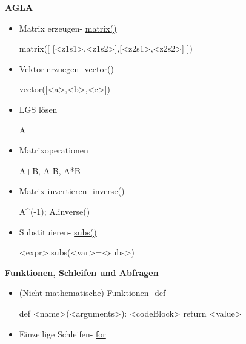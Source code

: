 \documentclass[a4paper,9pt,DIV15,twocolumn]{scrartcl}
\begin{document}
\textbf{AGLA}
\begin{itemize}
\item Matrix erzeugen- \href{https://sage.math.uni-goettingen.de/doc/static/reference/sage/matrix/constructor.html#sage.matrix.constructor.Matrix}{matrix()}
\begin{sagein}
matrix([ [<z1s1>,<z1s2>],[<z2s1>,<z2s2>] ])
\end{sagein}
 \item Vektor erzuegen- \href{https://sage.math.uni-goettingen.de/doc/static/reference/sage/modules/free_module_element.html#sage.modules.free_module_element.vector}{vector()}
\begin{sagein}
vector([<a>,<b>,<c>])
\end{sagein}
\item LGS lösen 
\begin{sagein}
A\b
\end{sagein}
\item Matrixoperationen 
\begin{sagein}
A+B, A-B, A*B
\end{sagein}
\item Matrix invertieren- \href{https://sage.math.uni-goettingen.de/doc/static/reference/sage/matrix/matrix2.html?highlight=matrix.inverse#sage.matrix.matrix2.Matrix.inverse}{inverse()}
\begin{sagein}
A^(-1); A.inverse()
\end{sagein}
\item Substituieren- \href{https://sage.math.uni-goettingen.de/doc/static/reference/sage/crypto/mq/mpolynomialsystem.html#sage.crypto.mq.mpolynomialsystem.MPolynomialRoundSystem_generic.subs}{subs()}
\begin{sagein}
<expr>.subs(<var>=<subs>)
\end{sagein}
\end{itemize}

\textbf{Funktionen, Schleifen und Abfragen}
\begin{itemize}
    \item (Nicht-mathematische) Funktionen- \href{http://docs.python.org/reference/compound_stmts.html#function-definitions}{def}
\begin{sagein}
def <name>(<arguments>):
	<codeBlock>
	return <value>
\end{sagein}
    \item Einzeilige Schleifen- \href{http://docs.python.org/tutorial/controlflow.html#for-statements}{for}
\begin{sagein}
\end{sagein}
\end{itemize}
\end{document}

